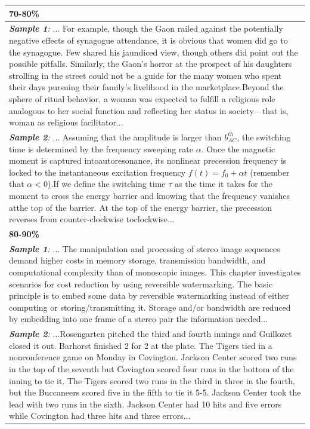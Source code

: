 \documentclass[11pt]{article}
\begin{document}
\begin{longtable}{p{15cm}}
\midrule
\small \textbf{70-80\%} \\
\midrule
\small \textit{\textbf{Sample 1}:}  ... For example, though the Gaon railed against the potentially negative effects of synagogue attendance, it is obvious that women did go to the synagogue. Few shared his jaundiced view, though others did point out the possible pitfalls. Similarly, the Gaon's horror at the prospect of his daughters strolling in the street could not be a guide for the many women who spent their days pursuing their family's livelihood in the marketplace.Beyond the sphere of ritual behavior, a woman was expected to fulfill a religious role analogous to her social function and reflecting her status in society—that is, woman as religious facilitator...  \\
\small \textit{\textbf{Sample 2}:}  ... Assuming that the amplitude is larger than $b_{AC}^{th}$, the switching time is determined by the frequency sweeping rate $\alpha$. Once the magnetic moment is captured intoautoresonance, its nonlinear precession frequency is locked to the instantaneous excitation frequency $f(t)=f_0+\alpha t$ (remember that $\alpha<0$).If we define the switching time $\tau$ as the time it takes for the moment to cross the energy barrier and knowing that the frequency vanishes atthe top of the barrier. At the top of the energy barrier, the precession reverses from counter-clockwise toclockwise...\\
\midrule
\small \textbf{80-90\%} \\
\midrule
\small \textit{\textbf{Sample 1}:} ... The manipulation and processing of stereo image sequences demand higher costs in memory storage, transmission bandwidth, and computational complexity than of monoscopic images. This chapter investigates scenarios for cost reduction by using reversible watermarking. The basic principle is to embed some data by reversible watermarking instead of either computing or storing/transmitting it. Storage and/or bandwidth are reduced by embedding into one frame of a stereo pair the information needed... \\
\small \textit{\textbf{Sample 2}:}  ...Rosengarten pitched the third and fourth innings and Guillozet closed it out. Barhorst finished 2 for 2 at the plate. The Tigers tied in a nonconference game on Monday in Covington. Jackson Center scored two runs in the top of the seventh but Covington scored four runs in the bottom of the inning to tie it. The Tigers scored two runs in the third in three in the fourth, but the Buccaneers scored five in the fifth to tie it 5-5. Jackson Center took the lead with two runs in the sixth. Jackson Center had 10 hits and five errors while Covington had three hits and three errors...\\

\end{longtable}
\end{document}
